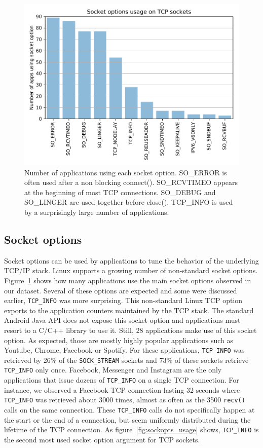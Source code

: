 \begin{figure}
\centering
\includegraphics[width=\columnwidth]{figures/sockopts_bars}
\caption{Number of applications using each socket option.
    SO\_ERROR is often used after a non blocking
connect(). SO\_RCVTIMEO appears at the beginning of most TCP connections.
SO\_DEBUG and SO\_LINGER are used together before close(). TCP\_INFO
is used by a surprisingly large number of applications.}
\label{fig:sockopts_bars}
\end{figure}

\subsection{Socket options}

Socket options can be used by applications to tune the behavior of
the underlying TCP/IP stack. Linux supports a growing number of
non-standard socket options. Figure~\ref{fig:sockopts_bars} shows how many
applications use the main socket options observed in our dataset.
Several of these options are expected and some were discussed earlier,
\texttt{TCP\_INFO} was more surprising. This non-standard Linux TCP option
exports to the application counters maintained by the TCP stack. The standard
Android Java API does not expose this socket option and applications must
resort to a C/C++ library to use it. Still, 28 applications make use
of this socket option. As expected, those are mostly highly popular
applications such as Youtube, Chrome, Facebook or Spotify. For these
applications, \texttt{TCP\_INFO} was retrieved by 26\% of the
\texttt{SOCK\_STREAM} sockets and 73\% of these sockets retrieve
\texttt{TCP\_INFO} only once. Facebook, Messenger and Instagram are the
only applications that issue dozens of \texttt{TCP\_INFO} on a 
single TCP connection. For instance, we observed a Facebook TCP
connection lasting 32 seconds where \texttt{TCP\_INFO} was retrieved about
3000 times, almost as often as the 3500 \texttt{recv()} calls on the same
connection. These \texttt{TCP\_INFO} calls do not specifically happen at the
start or the end of a connection, but seem uniformly distributed during the
lifetime of the TCP connection. As figure~\ref{fig:sockopts_usage} shows,
\texttt{TCP\_INFO} is the second most used socket option argument for TCP
sockets.
